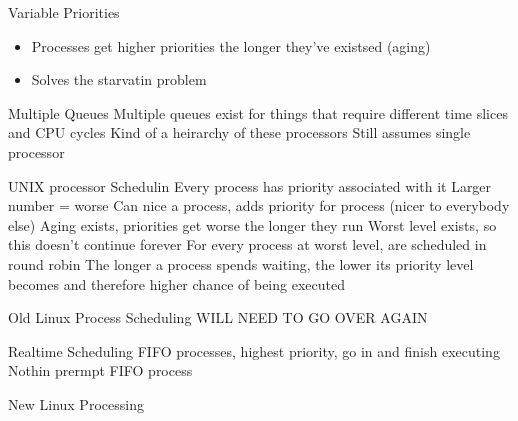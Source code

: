\documentclass{article}
\begin{document}
		Variable Priorities
		\begin{itemize}
			\item Processes get higher priorities the longer they've existsed (aging)
			\item Solves the starvatin problem
		\end{itemize}

	Multiple Queues
		Multiple queues exist for things that require different time slices and CPU cycles
		Kind of a heirarchy of these processors
		Still assumes single processor

	UNIX processor Schedulin		Every process has priority associated with it
		Larger number = worse
		Can nice a process, adds priority for process (nicer to everybody else)
		Aging exists, priorities get worse the longer they run
			Worst level exists, so this doesn't continue forever
			For every process at worst level, are scheduled in round robin
		The longer a process spends waiting, the lower its priority level becomes and therefore higher chance of being executed

	Old Linux Process Scheduling
		WILL NEED TO GO OVER AGAIN

	Realtime Scheduling
		FIFO processes, highest priority, go in and finish executing
		Nothin prermpt FIFO process

	New Linux Processing

				
				

		
\end{document}
